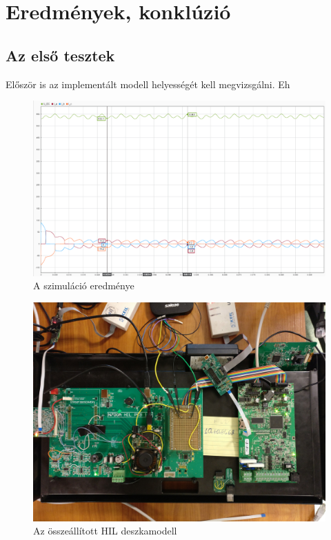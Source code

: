 \chapter{Eredmények, konklúzió}

\section{Az első tesztek}

Először is az implementált modell helyességét kell megvizsgálni. Eh

\begin{figure}[H]
	\centering
	\includegraphics[width = \textwidth]{figures/continous_testrun_1.png}
	\caption{A szimuláció eredménye} 
	\label{fig:cont_run}
\end{figure}

\begin{figure}[H]
	\centering
	\includegraphics[width = \textwidth]{figures/hil_table.jpg}
	\caption{Az összeállított HIL deszkamodell} 
	\label{fig:hil_desk}
\end{figure}

